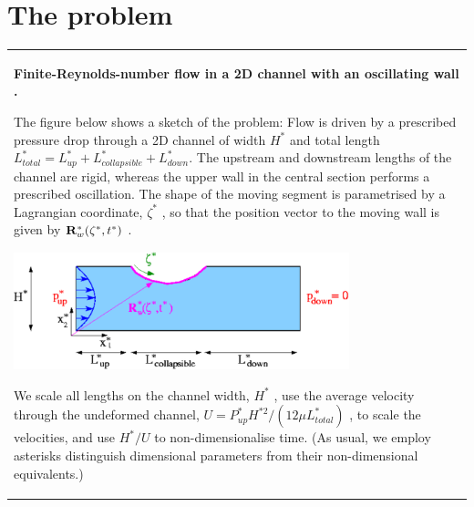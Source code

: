 \hypertarget{index_problem}{}\section{The problem}\label{index_problem}
\begin{center} \tabulinesep=1mm
\begin{longtabu} spread 0pt [c]{*{1}{|X[-1]}|}
\hline
\begin{center} {\bfseries Finite-\/\+Reynolds-\/number flow in a 2D channel with an oscillating wall .} \end{center} 

The figure below shows a sketch of the problem\+: Flow is driven by a prescribed pressure drop through a 2D channel of width $ H^* $ and total length $ L^*_{total} = L^*_{up} + L^*_{collapsible} + L^*_{down}. $ The upstream and downstream lengths of the channel are rigid, whereas the upper wall in the central section performs a prescribed oscillation. The shape of the moving segment is parametrised by a Lagrangian coordinate, $ \zeta^* $ , so that the position vector to the moving wall is given by $ {\bf R}_w^*(\zeta^*,t^*)$ .

 
\begin{DoxyImage}
\includegraphics[width=0.75\textwidth]{collapsible_channel_sketch}
\end{DoxyImage}


We scale all lengths on the channel width, $ H^* $ , use the average velocity through the undeformed channel, $ U =P^*_{up} H^{*2}/(12 \mu L^*_{total}) $ , to scale the velocities, and use $ H^{*}/U $ to non-\/dimensionalise time. (As usual, we employ asterisks distinguish dimensional parameters from their non-\/dimensional equivalents.)


\end{longtabu}
\end{center}
